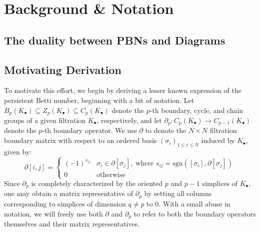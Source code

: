 \documentclass[12pt]{article}
\numberwithin{equation}{section}
\newcommand{\+}{%
	\raisebox{0.18ex}{\scaleobj{0.55}{+}}
}
\theoremstyle{definition}
\begin{document}

\section{Background \& Notation}\label{sec:background_notation}


\subsection{The duality between PBNs and Diagrams}\label{sec:duality_pbn_dgm}



\subsection{Motivating Derivation}\label{sec:betti_derivation}
To motivate this effort, we begin by deriving a lesser known
expression of the persistent Betti number, beginning with a bit of notation. 
Let $B_p(K_\bullet) \subseteq Z_p(K_\bullet) \subseteq C_p(K_\bullet)$ denote the $p$-th boundary, cycle, and chain groups of a given filtration $K_\bullet$, respectively, and let $\partial_p : C_p( K_{\bullet}) \to C_{p-1}(K_{\bullet})$ denote the $p$-th boundary operator. 
We use $\partial$ to denote the $N \times N$ filtration boundary matrix with respect to an ordered basis $(\sigma_i)_{1 \leq i \leq N}$ induced by $K_\bullet$, given by:
\begin{equation}\label{eq:boundary_matrix}
	\partial[i,j] = \begin{cases}
		(-1)^{s_{ij}} & \sigma_i \in \partial[\sigma_j], \; \text{where } s_{ij} = \mathrm{sgn}([\sigma_i], \partial [\sigma_j])  \\
		0 & \text{otherwise}
	\end{cases}
\end{equation}
Since $\partial_p$ is completely characterized by the oriented $p$ and $p-1$ simplices of $K_\bullet$,  one may obtain a matrix representative of $\partial_p$ by setting all columns corresponding to simplices of dimension $q \neq p$ to $0$. 
With a small abuse in notation, we will freely use both $\partial$ and $\partial_p$ to refer to both the boundary operators themselves and their matrix representatives.
\end{document}
